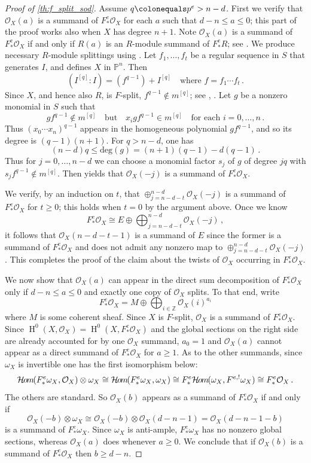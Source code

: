 \documentclass{amsart}
\newcommand{\mco}{\mathcal{O}}
\newcommand{\hh}{\operatorname{H}}
\newcommand{\SheafHom}{\mathcal{H}\kern -1pt o\kern -1 pt m\kern -1pt}
\theoremstyle{definition}
\theoremstyle{remark}
\numberwithin{equation}{subsection}
\begin{document}
\begin{proof}[Proof of \cref{th:f_split_sod}]
Assume $q\colonequals p^e > n-d$. First we verify that  $\mco_X(a)$ is a summand of $F_*^e\mco_X$ for each $a$ such that $d-n\le a\le 0$; this part of the proof works also when $X$ has degree $n+1$. Note $\mco_X(a)$ is a summand of $F^e_*\mco_X$ if and only if $R(a)$ is an $R$-module summand of $F^e_*R$; see \cite[Theorem 3.10]{Karen2000Vanishing}. We produce necessary $R$-module splittings using . Let  $f_1,\ldots, f_t$ be a regular sequence in $S$ that generates $I$, and  defines $X$ in $\mathbb{P}^n$. Then
\[
(I^{[q]}: I)= (f^{q-1})+ I^{[q]} \quad \text{where} \,\, f= f_1\cdots f_t \,. 
 \]
Since $X$, and hence also $R$, is $F$-split, $f^{q-1} \notin m^{[q]}$; see  \cite[section 2]{Fedder:1983}, \cite[Prop 4.10]{Karen1997SC}. Let $g$ be a nonzero monomial in $S$ such that
\[
 g f^{q-1} \notin m^{[q]}\quad \text{but}\quad x_igf^{q-1} \in m^{[q]}  \quad\text{for each } i=0,\ldots,n\,.
 \]
Thus $(x_0\cdots x_n)^{q-1}$ appears in the homogeneous polynomial $g f^{q-1}$, and so its degree is $(q-1)(n+1)$. For $q> n-d$, one has
\[
(n-d)q \leq \text{deg}(g)= (n+1)(q-1)- d(q-1) \, .
\]
Thus for  $j=0,\ldots, n-d$ we can choose a monomial factor $s_j$ of $g$ of degree $jq$ with $s_jf^{q-1} \notin m^{[q]}$. Then  yields that  $\mco_X(-j)$ is a summand of $F^e_*\mco_X$.

We verify, by an induction on $t$, that $\oplus_{j=n-d-t}^{n-d} \mco_X(-j)$ is a summand of $F^e_*\mco_X$ for $t \geq 0$; this holds when $t=0$ by the argument above.
 Once we know 
\[
F^e_*\mco_X \cong E \oplus \bigoplus_{j=n-d-t}^{n-d}\mco_X(-j) \,,
\]
it follows that $\mco_X(n-d-t-1)$ is a summand of $E$ since the former is a summand of $F^e_* \mco_X$ and does not admit any nonzero map to $\oplus_{j=n-d-t}^{n-d}\mco_X(-j)$. This completes the proof of the claim about the twists of $\mco_X$ occurring in $F^e_*\mco_X$.

We now show that $\mco_X(a)$ can appear in the direct sum decomposition of $F_*^e\mco_X$ only if $d-n\le a\le 0$ and exactly one copy of $\mco_X$ splits. To that end, write
\[
F_*^e \mco_X = M\oplus \bigoplus_{i\in\mathbb{Z}}  \mco_X(i)^{a_i} 
\]
where $M$ is some coherent sheaf. Since $X$ is $F$-split, $\mco_X$ is a summand of $F^e_* \mco_X$. Since $\hh^0(X,\mco_X)=\hh^0(X,F_*^e \mco_X)$ and the global sections on the right side are already accounted for by one $\mco_X$ summand, $a_0=1$ and $\mco_X(a)$ cannot appear as a direct summand of $F_*^e \mco_X$ for $a\ge 1$.  As to the other summands, since $\omega_X$ is invertible  one has the first isomorphism below:
\[
\SheafHom(F^e_*\omega_X, \mco_X) \otimes \omega_X \cong \SheafHom(F^e_*\omega_X, \omega_X) \cong F^e_*\SheafHom(\omega_X, F^{e, !}\omega_X)\cong F^e_*\mco_X \,.
\]
The others are standard. So $\mco_X(b)$ appears as a summand of $F^e_*\mco_X$ if and only if 
 \[
 \mco_X(-b) \otimes \omega_X \cong \mco_X(-b) \otimes \mco_X(d-n-1) = \mco_X(d-n-1-b)
 \]
 is a summand of $F^e_*\omega_X$. Since $\omega_X$ is anti-ample, $F^e_*\omega_X$ has no nonzero global sections, whereas $\mco_X(a)$ does whenever $a\ge 0$. We conclude that if $\mco_X(b)$ is a summand of $F^e_* \mco_X$ then $b\ge d-n$. 


\end{proof}
\end{document}
